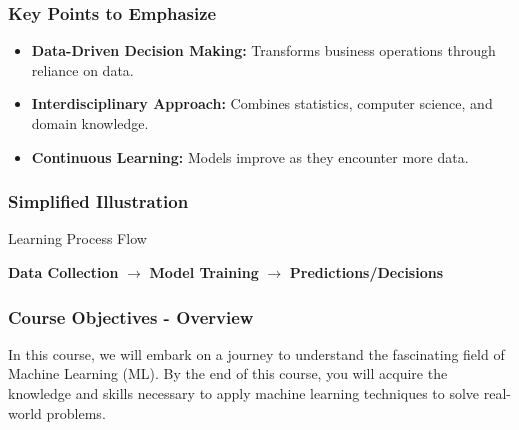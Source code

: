 \documentclass[aspectratio=169]{beamer}
\begin{document}
\begin{frame}[fragile]
    \frametitle{Key Points to Emphasize}

    \begin{itemize}
        \item \textbf{Data-Driven Decision Making:} Transforms business operations through reliance on data.
        \item \textbf{Interdisciplinary Approach:} Combines statistics, computer science, and domain knowledge.
        \item \textbf{Continuous Learning:} Models improve as they encounter more data.
    \end{itemize}
\end{frame}

\begin{frame}[fragile]
    \frametitle{Simplified Illustration}

    \begin{block}{Learning Process Flow}
        \begin{center}
            \textbf{Data Collection} $\rightarrow$ \textbf{Model Training} $\rightarrow$ \textbf{Predictions/Decisions}
        \end{center}
    \end{block}
\end{frame}

\begin{frame}[fragile]
    \frametitle{Course Objectives - Overview}
    In this course, we will embark on a journey to understand the fascinating field of Machine Learning (ML). 
    By the end of this course, you will acquire the knowledge and skills necessary to apply machine learning techniques to solve real-world problems.
\end{frame}
\end{document}

